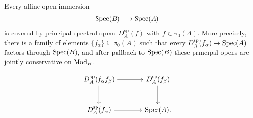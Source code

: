 \begin{proposition}
\label{prop:principal-opens-basis}
Every affine open immersion
\[
    \operatorname{Spec}(B)\longrightarrow\operatorname{Spec}(A)
\]
is covered by principal spectral opens \(D_A^{\mathrm{sp}}(f)\) with
\(f\in\pi_0(A)\). More precisely, there is a family of elements
\(\{f_\alpha\}\subseteq\pi_0(A)\) such that every
\(D_A^{\mathrm{sp}}(f_\alpha)\to\operatorname{Spec}(A)\) factors through
\(\operatorname{Spec}(B)\), and after pullback to \(\operatorname{Spec}(B)\) these principal opens are
jointly conservative on \(\operatorname{Mod}_B\).
\end{proposition}

\[
\begin{tikzcd}[column sep=large, row sep=large]
    D_A^{\mathrm{sp}}(f_\alpha f_\beta)
        \arrow[r]
        \arrow[d]
    &
    D_A^{\mathrm{sp}}(f_\beta)
        \arrow[d]
    \\
    D_A^{\mathrm{sp}}(f_\alpha)
        \arrow[r]
    &
    \Spec(A).
\end{tikzcd}
\]


